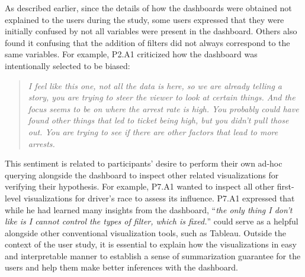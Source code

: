 \par As described earlier, since the details of how the dashboards were obtained  not explained to the users during the study, some users expressed that they were initially confused by \system {} not all variables were present in the dashboard. Others also found it confusing that the addition of filters did not always correspond to the same variables. For example, P2.A1 criticized how the dashboard was intentionally selected to be biased:
\begin{quote}
\textit{I feel like this one, not all the data is here, so we are already telling a story, you are trying to steer the viewer to look at certain things. And the focus seems to be on where the arrest rate is high. You probably could have found other things that led to ticket being high, but you didn't pull those out. You are trying to see if there are other factors that lead to more arrests.}
\end{quote}
\npar This sentiment is related to participants' desire to perform their own ad-hoc querying alongside the dashboard to inspect other related visualizations for verifying their hypothesis. For example, P7.A1 wanted to inspect all other first-level visualizations for driver's race to assess its influence. P7.A1 expressed that while he had learned many insights from the dashboard, ``\textit{the only thing I don't like is I cannot control the types of filter, which is fixed.}''  \system could serve as a helpful  alongside other conventional visualization tools, such as Tableau. Outside the context of the user study, it is essential to explain how \system {} the visualizations in  easy and interpretable manner to establish a sense of summarization guarantee for the users and help them make better inferences with the dashboard.

